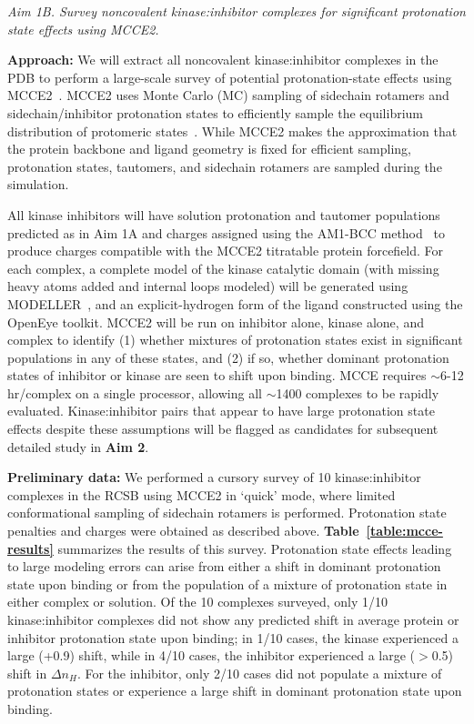 \documentclass[11pt]{article}
\begin{document}
\eject

\emph{Aim 1B. Survey noncovalent kinase:inhibitor complexes for significant protonation state effects using MCCE2.}

{\bf Approach:} 
We will extract all noncovalent kinase:inhibitor complexes in the PDB to perform a large-scale survey of potential protonation-state effects using MCCE2~\cite{gunner:bba:2000:proton-electron-transfer,gunner:j-comput-chem:2009:mcce2}.
MCCE2 uses Monte Carlo (MC) sampling of sidechain rotamers and sidechain/inhibitor protonation states to efficiently sample the equilibrium distribution of protomeric states~\cite{gunner:bba:2000:proton-electron-transfer,gunner:j-comput-chem:2009:mcce2}.
While MCCE2 makes the approximation that the protein backbone and ligand geometry is fixed for efficient sampling, protonation states, tautomers, and sidechain rotamers are sampled during the simulation.

All kinase inhibitors will have solution protonation and tautomer populations predicted as in Aim 1A and charges assigned using the AM1-BCC method~\cite{am1bcc1,am1bcc2} to produce charges compatible with the MCCE2 titratable protein forcefield.
For each complex, a complete model of the kinase catalytic domain (with missing heavy atoms added and internal loops modeled) will be generated using MODELLER~\cite{qian:nature:2007:modeller,wang:jmb:2007:modeller}, and an explicit-hydrogen form of the ligand constructed using the OpenEye toolkit.
MCCE2 will be run on inhibitor alone, kinase alone, and complex to identify (1) whether mixtures of protonation states exist in significant populations in any of these states, and (2) if so, whether dominant protonation states of inhibitor or kinase are seen to shift upon binding.  
MCCE requires $\sim$6-12 hr/complex on a single processor, allowing all $\sim$1400 complexes to be rapidly evaluated. 
Kinase:inhibitor pairs that appear to have large protonation state effects despite these assumptions will be flagged as candidates for subsequent detailed study in {\bf Aim 2}.  

{\bf Preliminary data:}
We performed a cursory survey of 10 kinase:inhibitor complexes in the RCSB using MCCE2 in `quick' mode, where limited conformational sampling of sidechain rotamers is performed.
Protonation state penalties and charges were obtained as described above.
{\bf Table~\ref{table:mcce-results}} summarizes the results of this survey.
Protonation state effects leading to large modeling errors can arise from either a shift in dominant protonation state upon binding or from the population of a mixture of protonation state in either complex or solution.
Of the 10 complexes surveyed, only 1/10 kinase:inhibitor complexes did not show any predicted shift in average protein or inhibitor protonation state upon binding; in 1/10 cases, the kinase experienced a large (+0.9) shift, while in 4/10 cases, the inhibitor experienced a large ($>$0.5) shift in $\Delta n_H$.
For the inhibitor, only 2/10 cases did not populate a mixture of protonation states or experience a large shift in dominant protonation state upon binding.
\end{document}
